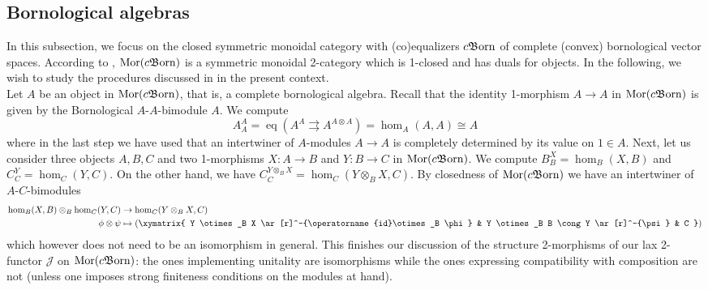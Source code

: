 \documentclass{article}
\newcommand{\id}{\operatorname{id}}%
\newcommand{\Mor}{\operatorname{Mor}}%
\newcommand{\cBorn}{c\mathfrak{B}\hspace{-0.05cm}\operatorname{orn}}%
\newcommand{\equa}{\operatorname{eq}}%
\numberwithin{equation}{section}
\theoremstyle{definition}
\theoremstyle{theorem}
\begin{document}
\subsection{Bornological algebras}\label{Subsection: Bornological algebras}
In this subsection, we focus on the closed symmetric monoidal category with (co)equalizers $\cBorn$ of complete (convex) bornological vector spaces. 
According to , $\Mor(\cBorn)$ is a symmetric monoidal 2-category which is 1-closed and has duals 
for objects. In the following, we wish to study the procedures discussed in  in the present context.\\

Let $A$ be an object in $\Mor(\cBorn)$, that is, a complete bornological algebra. Recall that the identity 1-morphism $A \to A$ in $\Mor(\cBorn)$ is given 
by the Bornological $A$-$A$-bimodule $A$. We compute 
\begin{equation}
    A^A_A = \equa (A^A \rightrightarrows A^{A \otimes A}) = \hom_A(A,A) \cong A
\end{equation}
where in the last step we have used that an intertwiner of $A$-modules $A \to A$ is completely determined by its value on $1 \in A$. Next, let us consider 
three objects $A,B,C$ and two 1-morphisms $X \colon A \to B$ and $Y \colon B \to C$ in $\Mor(\cBorn)$. We compute $B^X_B = \hom_B(X,B)$ and $C^Y_C = \hom_C(Y,C)$. 
On the other hand, we have $C^{Y \otimes_B X}_C = \hom_C(Y \otimes_B X,C)$. By closedness of $\Mor(\cBorn)$ we have an intertwiner of $A$-$C$-bimodules
\begin{align*}
    \hom_B(X,B) \otimes_B \hom_C(Y,C) &\to \hom_C(Y \otimes_B X,C)\\
    \phi \otimes \psi &\mapsto \left( 
    \xymatrix{
        Y \otimes_B X \ar[r]^-{\id \otimes_B \phi} & Y \otimes_B B \cong Y \ar[r]^-{\psi} & C
    } \right)
\end{align*}
which however does not need to be an isomorphism in general. This finishes our discussion of the structure 2-morphisms of our lax 
2-functor $\mathcal{J}$ on $\Mor(\cBorn)$: the ones implementing unitality are isomorphisms while the ones expressing compatibility with composition are not (unless 
one imposes strong finiteness conditions on the modules at hand). \\
\end{document}
